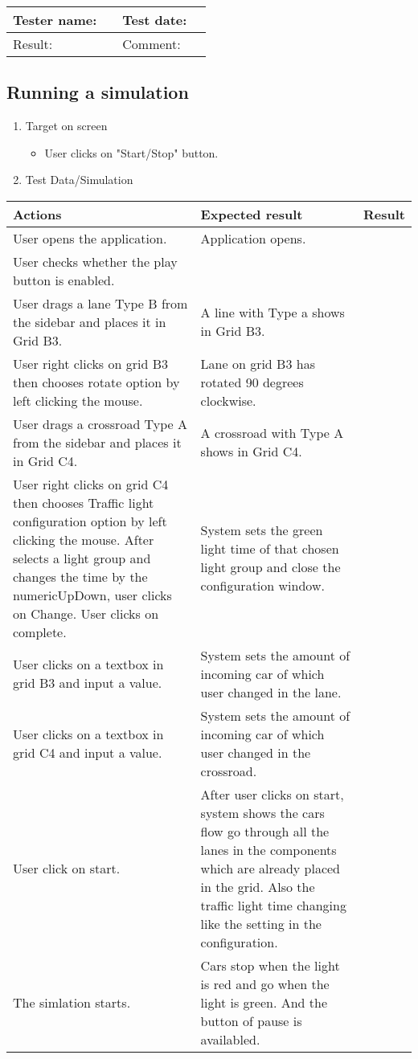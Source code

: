 \begin{tabularx}{\textwidth}{|p{3cm}X|p{3cm}X|}\hline
	Tester name: &  & Test date: & \\\hline
	Result: &   \pass & Comment: & \\\hline
\end{tabularx}

\newpage 

\subsection{Running a simulation}

\begin{enumerate}

	\item Target on screen
	\begin{itemize}
		\item User clicks on "Start/Stop" button.
	\end{itemize}
	\item Test Data/Simulation
\end{enumerate}	
	\begin{tabularx}{\textwidth}{|X|X|p{2.5cm}|}\hline
		Actions & Expected result & Result \\\hline
		User opens the application.& Application opens. &  \pass \\\hline
		User checks whether the play button is enabled. & &  \pass \\\hline
		User drags a lane Type B from the sidebar and places it in Grid B3. & A line with Type a shows in Grid B3. & \pass \\\hline
		User right clicks on grid B3 then chooses rotate option by left clicking the mouse. & Lane on grid B3 has rotated 90 degrees clockwise. & \pass \\\hline
		User drags a crossroad Type A from the sidebar and places it in Grid C4. & A crossroad with Type A shows in Grid C4. & \pass \\\hline
		User right clicks on grid C4 then chooses Traffic light configuration  option by left clicking the mouse. After selects a light group and changes the time by the numericUpDown, user clicks on Change. User clicks on complete. & System sets the green light time of that chosen light group and close the configuration window.  & \pass \\\hline
		User clicks on a textbox in grid B3 and input a value. & System sets the amount of incoming car of which user changed in the lane. & \pass \\\hline
		User clicks on a textbox in grid C4 and input a value. & System sets the amount of incoming car of which user changed in the crossroad. & \pass \\\hline
		User click on start. & After user clicks on start, system shows the cars flow go through all the lanes in the components which are already placed in the grid. Also the traffic light time changing like the setting in the configuration. & \pass \\\hline
		The simlation starts. &	Cars stop when the light is red and go when the light is green. And the button of pause is availabled. & \pass \\\hline	
	\end{tabularx}
